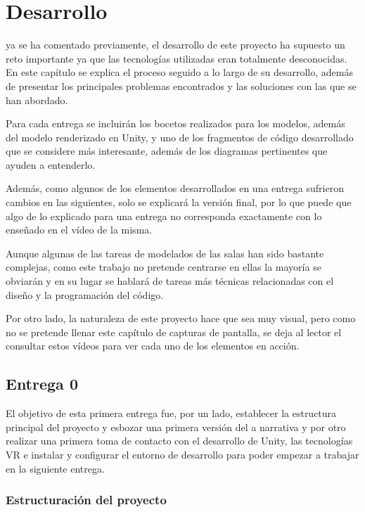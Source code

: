 \chapter{Desarrollo}
\label{chap:desarrollo}

 ya se ha comentado previamente, el desarrollo de este proyecto ha supuesto un reto importante ya que las tecnologías utilizadas eran totalmente desconocidas. En este capítulo se explica el proceso seguido a lo largo de su desarrollo, además de presentar los principales problemas encontrados y las soluciones con las que se han abordado.

Para cada entrega se incluirán los bocetos realizados para los modelos, además del modelo renderizado en Unity, y uno de los fragmentos de código desarrollado que se considere más interesante, además de los diagramas pertinentes que ayuden a entenderlo.

Además, como algunos de los elementos desarrollados en una entrega sufrieron cambios en las siguientes, solo se explicará la versión final, por lo que puede que algo de lo explicado para una entrega no corresponda exactamente con lo enseñado en el vídeo de la misma.

Aunque algunas de las tareas de modelados de las salas han sido bastante complejas, como este trabajo no pretende centrarse en ellas la mayoría se obviarán y en su lugar se hablará de tareas más técnicas relacionadas con el diseño y la programación del código.

Por otro lado, la naturaleza de este proyecto hace que sea muy visual, pero como no se pretende llenar este capítulo de capturas de pantalla, se deja al lector el consultar estos vídeos para ver cada uno de los elementos en acción.

\section{Entrega 0}

El objetivo de esta primera entrega fue, por un lado, establecer la estructura principal del proyecto y esbozar una primera versión del a narrativa y por otro realizar una primera toma de contacto con el desarrollo de Unity, las tecnologías \acs{VR} e instalar y configurar el entorno de desarrollo para poder empezar a trabajar en la siguiente entrega.

\subsection{Estructuración del proyecto}

